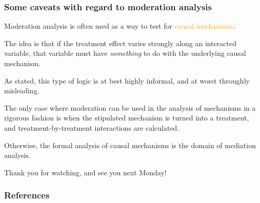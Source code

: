 \documentclass[12pt,english,dvipsnames,aspectratio=169,handout]{beamer}\usepackage[]{graphicx}\usepackage[]{xcolor}
\begin{document}
\begin{frame}
  \frametitle{Some caveats with regard to moderation analysis}
\footnotesize

Moderation analysis is often used as a way to test for \textcolor{orange}{causal mechanisms}. 

The idea is that if the treatment effect varies strongly along an interacted variable, that variable must have \emph{something} to do with the underlying causal mechanism.

As stated, this type of logic is at best highly informal, and at worst throughly misleading. 

The only case where moderation can be used in the analysis of mechanisms in a rigorous fashion is when the stipulated mechanism is turned into a treatment, and treatment-by-treatment interactions are calculated.

Otherwise, the formal analysis of causal mechanisms is the domain of mediation analysis. 

\vspace{1cm}
\end{frame}




\begin{frame}
\begin{center}
    \LARGE Thank you for watching, and see you next Monday!
\end{center}
\end{frame}


\begin{frame}[allowframebreaks]
\frametitle{References}

\scriptsize
\end{frame}
\end{document}
